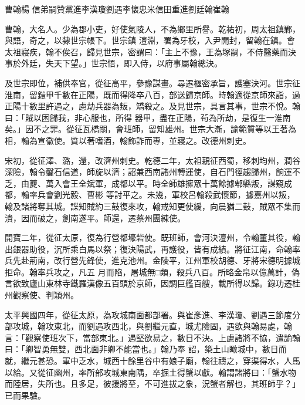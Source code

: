 
\begin{pinyinscope}

 曹翰楊
 信弟嗣贊黨進李漢瓊劉遇李懷忠米信田重進劉廷翰崔翰



 曹翰，大名人。少為郡小吏，好使氣陵人，不為鄉里所譽。乾祐初，周太祖鎮鄴，與語，奇之，以隸世宗帳下。世宗鎮
 澶淵，署為牙校，入尹開封，留翰在鎮。會太祖寢疾，翰不俟召，歸見世宗，密謂曰：「主上不豫，王為塚嗣，不侍醫藥而決事於外廷，失天下望。」世宗悟，即入侍，以府事屬翰總決。



 及世宗即位，補供奉官，從征高平，參豫謀畫。尋遷樞密承旨，護塞決河。世宗征淮南，留鎧甲千數在正陽，既而得降卒八百，部送歸京師。時翰適從京師來詣，過正陽十數里許遇之，慮劫兵器為叛，矯殺之。及見世宗，具言其事，世宗不悅。翰曰：「賊以困歸我，非心服也，所得
 器甲，盡在正陽，茍為所劫，是復生一淮南矣。」因不之罪。從征瓦橋關，會班師，留知雄州。世宗大漸，諭範質等以王著為相，翰為宣徽使。質以著嗜酒，翰飾詐而專，並寢之。改德州刺史。



 宋初，從征澤、潞，還，改濟州刺史。乾德二年，太祖親征西蜀，移刺均州，澗谷深險，翰令鑿石信道，師旋以濟；詔兼西南諸州轉運使，自石門徑趨歸州，餉運不乏，由夔、萬入會王全斌軍，成都以平。時全師雄擁眾十萬餘據郫縣叛，謀窺成都，翰率兵會劉光毅、曹彬
 等討平之。未幾，軍校呂翰殺武懷節，據嘉州以叛，翰及諸將奪其城。諜知賊約三鼓復來攻，翰戒知更使緩，向晨猶二鼓，賊眾不集而潰，因而破之，劍南遂平。師還，遷蔡州團練使。



 開寶二年，從征太原，復為行營都壕砦使。既班師，會河決澶州，令翰董其役，翰出銀器助役，沉所乘白馬以祭；復決陽武，再護役，皆有成績。將征江南，命翰率兵先赴荊南，改行營先鋒使，進克池州。金陵平，江州軍校胡德、牙將宋德明據城拒命。翰率兵攻之，凡五
 月而陷，屠城無□類，殺兵八百。所略金帛以億萬計，偽言欲致廬山東林寺鐵羅漢像五百頭於京師，因調巨艦百艘，載所得以歸。錄功遷桂州觀察使、判穎州。



 太平興國四年，從征太原，為攻城南面都部署。與崔彥進、李漢瓊、劉遇三節度分部攻城，翰攻東北，而劉遇攻西北，與劉繼元直，城尤險固，遇欲與翰易處，翰言：「觀察使班次下，當部東北。」遇堅欲易之，數日不決。上慮諸將不協，遣諭翰曰：「卿智勇無雙，西北面非卿不能當也。」翰乃奉
 詔，築土山瞰城中，數日而就，繼元甚恐。軍中乏水，城西十餘里谷中有娘子廟，翰往禱之，穿渠得水，人馬以給。又從征幽州，率所部攻城東南隅，卒掘土得蟹以獻。翰謂諸將曰：「蟹水物而陸居，失所也。且多足，彼援將至，不可進拔之象，況蟹者解也，其班師乎？」已而果驗。




\end{pinyinscope}

